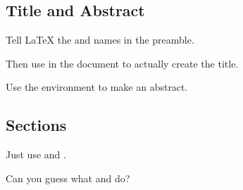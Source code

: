 \documentclass[aspectratio=169]{beamer}
\begin{document}
\subsection{Title and Abstract}
\begin{frame}[fragile]{\insertsubsection}
\begin{itemize}{\small
\item Tell \LaTeX{} the  and  names in the preamble.
\item Then use  in the document to actually create the title.
\item Use the  environment to make an abstract.
}\end{itemize}
\end{frame}


\subsection{Sections}
\begin{frame}{\insertsubsection}
\begin{itemize}{\small
\item Just use  and .
\item Can you guess what  and  do?
}\end{itemize}
\end{frame}
\end{document}

